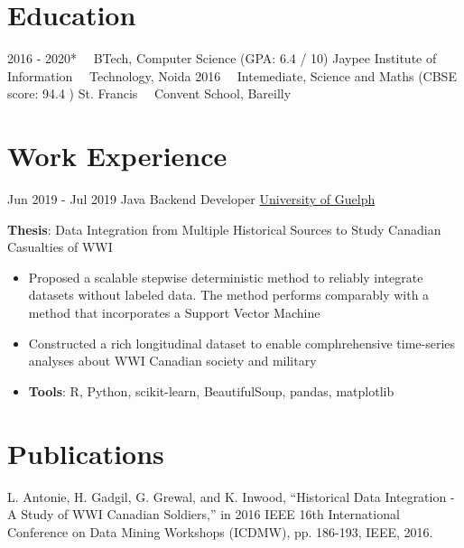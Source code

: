 \documentclass[letterpaper]{twentysecondcv} %
\begin{document}
\makeprofile %

\section{Education}

\begin{twenty} %
	\twentyitem
    	{2016 - 2020*}
        {}
        {~~BTech, Computer Science \textnormal{(GPA: 6.4 / 10)}}
        {{}{Jaypee Institute of Information ~~Technology, Noida}}
        {}
        {}
	\twentyitem
    	{2016}
		{}
        {~~Intemediate, Science and Maths \textnormal{(CBSE score: 94.4 )}}
        {St. Francis ~~Convent School, Bareilly }
        {}
        {}
\end{twenty}

\section{Work Experience}
\begin{twenty}
	\twentyitem
    	{Jun 2019 -  Jul 2019}
		{}
        {Java Backend Developer}
        {\href{http://www.uoguelph.ca/}{University of Guelph}}
        {}
        {
       	\textbf{Thesis}: Data Integration from Multiple Historical Sources to Study Canadian Casualties of WWI
        {\begin{itemize}
        \item Proposed a scalable stepwise deterministic method to reliably integrate datasets without labeled data. The method performs comparably with a method that incorporates a Support Vector Machine
        \item Constructed a rich longitudinal dataset to enable comphrehensive time-series analyses about WWI Canadian society and military
        \item \textbf{Tools}: R, Python, scikit-learn, BeautifulSoup, pandas, matplotlib \vspace{2mm}
		\end{itemize}}
        }
\end{twenty}

\section{Publications}
L. Antonie, H. Gadgil, G. Grewal, and K. Inwood, “Historical Data Integration - A Study of WWI Canadian Soldiers,” in 2016 IEEE 16th International Conference on Data Mining Workshops (ICDMW), pp. 186-193, IEEE, 2016. \vspace{2mm}
\end{document}
